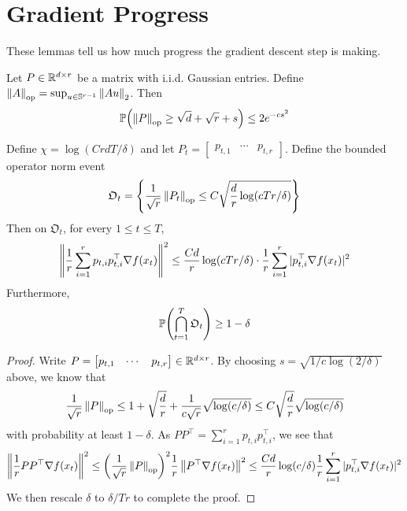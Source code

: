 \section{Gradient Progress}
These lemmas tell us how much progress the gradient descent step is making.
\begin{lemma}
    Let $P \in \R^{d \times r}$ be a matrix with i.i.d. Gaussian entries. Define $\mg{A}_{\mathrm{op}} = \sup_{u \in \mathbb S^{r-1}} \mg{Au}_2$. Then
    \begin{align*}
        \P(\mg{P}_{\mathrm{op}} \geq \sqrt{d} + \sqrt{r} + s) \leq 2e^{-cs^2}
    \end{align*}
\end{lemma}
\begin{proposition}
Define $\chi = \log(CrdT/\delta)$ and let $P_t = \begin{bmatrix} p_{t,1} & \cdots & p_{t,r} \end{bmatrix}$. Define the bounded operator norm event
    \begin{align*}
        \mathfrak O_t = \set{\frac{1}{\sqrt{r}}\mg{P_t}_{\mathrm{op}} \leq C \sqrt{\frac{d}{r}\log(cTr / \delta)}}
    \end{align*}
    Then on $\mathfrak O_t$, for every $1 \leq t \leq T$, 
    \begin{align*}
        \left\|\frac 1r \sum_{i=1}^r p_{t,i}p_{t,i}^\top \grad f(x_t) \right\|^2 \leq \frac{Cd}{r} \log(cTr/\delta) \cdot \frac 1r \sum_{i=1}^r |p_{t,i}^\top \grad f(x_t)|^2
    \end{align*}
    Furthermore, 
    \begin{align*}
        \P(\bigcap_{t=1}^{T} \mathfrak O_t) \geq 1 - \delta
    \end{align*}
\end{proposition}
\begin{proof}
    Write $P = \begin{bmatrix}
        p_{t,1} & \cdots & p_{t,r}
    \end{bmatrix} \in \R^{d \times r}$. By choosing $s = \sqrt{1/c \log(2/\delta)}$ above, we know that 
    \begin{align*}
        \frac{1}{\sqrt{r}} \mg{P}_{\mathrm{op}} \leq 1 + \sqrt{\frac{d}{r}} + \frac{1}{c\sqrt{r}} \sqrt{\log(c/\delta)} \leq C\sqrt{\frac{d}{r}} \sqrt{\log(c/\delta)}
    \end{align*}
    with probability at least $1-\delta$. As $PP^\top = \sum_{i=1}^r p_{t,i}p_{t,i}^\top$, we see that
    \begin{align*}
        \left \|\frac 1r PP^\top \grad f(x_t) \right \|^2 \leq \qty(\frac{1}{\sqrt{r}}\mg{P}_{\mathrm{op}})^2 \frac 1r \mg{P^\top \grad f(x_t)}^2 \leq \frac{Cd}{r} \log(c/\delta) \frac 1r \sum_{i=1}^r |p_{t,i}^\top \grad f(x_t)|^2
    \end{align*}
    We then rescale $\delta$ to $\delta/Tr$ to complete the proof. 
\end{proof}

